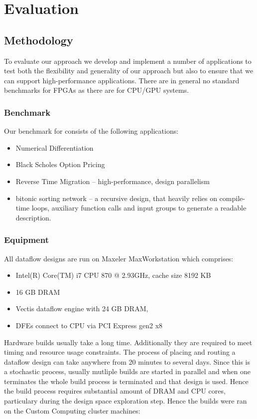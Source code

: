 \chapter{Evaluation}
\label{sec:evaluation}

\section{Methodology}

To evaluate our approach we develop and implement a number of applications
to test both the flexibility and generality of our approach but also to
ensure that we can support high-performance applications. There are in general
no standard benchmarks for FPGAs as there are for CPU/GPU systems.

\subsection{Benchmark}
\label{sec:bechmark}
Our benchmark for consists of the following applications:
\begin{itemize}
\item Numerical Differentiation
\item Black Scholes Option Pricing
\item Reverse Time Migration -- high-performance, design parallelism
\item bitonic sorting network -- a recursive design, that heavily
relies on compile-time loops, auxiliary function calls and input
groups to generate a readable description.
\end{itemize}

\subsection{Equipment}

All dataflow designs are run on Maxeler MaxWorkstation
\cite{MaxWorkstation} which comprises:
\begin{itemize}
\item Intel(R) Core(TM) i7 CPU 870 @ 2.93GHz, cache size 8192 KB
\item 16 GB DRAM
\item Vectis dataflow engine with 24 GB DRAM,
\item DFEs connect to CPU via PCI Express gen2 x8
\end{itemize}

Hardware builds usually take a long time. Additionally they are
required to meet timing and resource usage constraints. The process of
placing and routing a dataflow design can take anywhere from 20
minutes to several days. Since this is a stochastic process, usually
mutliple builds are started in parallel and when one terminates the
whole build process is terminated and that design is used. Hence the
build process requires substantial amount of DRAM and CPU cores,
particulary during the design space exploration step. Hence the builds
were ran on the Custom Computing cluster machines:

